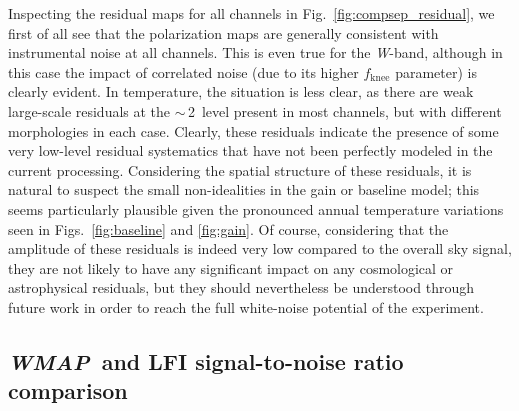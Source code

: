 \documentclass[twocolumn]{../../common/aa}
\def\WMAP{\emph{WMAP}}
\newcommand{\W}[0]{\textit W}
\begin{document}
Inspecting the residual maps for all channels in Fig.~\ref{fig:compsep_residual}, we first of all see that the polarization maps are generally consistent with instrumental noise at all channels. This is even true for the \W-band, although in this case the impact of correlated noise (due to its higher $f_{\mathrm{knee}}$ parameter) is clearly evident. In temperature, the situation is less clear, as there are weak large-scale residuals at the $\sim$\,2\muK\ level present in most channels, but with different morphologies in each case. Clearly, these residuals indicate the presence of some very low-level residual systematics that have not been perfectly modeled in the current processing. Considering the spatial structure of these residuals, it is natural to suspect the small non-idealities in the gain or baseline model; this seems particularly plausible given the pronounced annual temperature variations seen in Figs.~\ref{fig:baseline} and \ref{fig:gain}. Of course, considering that the amplitude of these residuals is indeed very low compared to the overall sky signal, they are not likely to have any significant impact on any cosmological or astrophysical residuals, but they should nevertheless be understood through future work in order to reach the full white-noise potential of the experiment.



\subsection{\WMAP\ and LFI signal-to-noise ratio comparison}
\label{sec:s2n}
\end{document}
